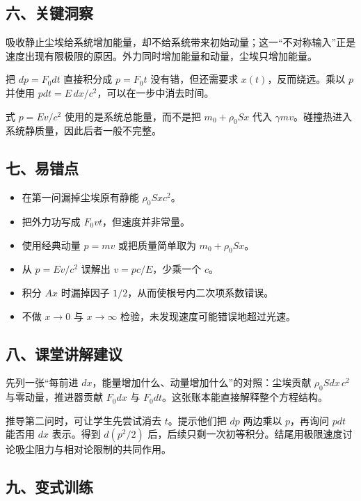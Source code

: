 \documentclass[12pt,a4paper,UTF8]{ctexart}
\newcommand{\tightlist}{\setlength{\itemsep}{0pt}\setlength{\parskip}{0pt}}
\begin{document}
\subsection{六、关键洞察}\label{ux516dux5173ux952eux6d1eux5bdf-2}

吸收静止尘埃给系统增加能量，却不给系统带来初始动量；这一``不对称输入''正是速度出现有限极限的原因。外力同时增加能量和动量，尘埃只增加能量。

把 \(dp=F_0dt\) 直接积分成 \(p=F_0t\) 没有错，但还需要求
\(x(t)\)，反而绕远。乘以 \(p\) 并使用
\(pdt=E\,dx/c^2\)，可以在一步中消去时间。

式 \(p=Ev/c^2\) 使用的是系统总能量，而不是把 \(m_0+\rho_0Sx\) 代入
\(\gamma mv\)。碰撞热进入系统静质量，因此后者一般不完整。

\subsection{七、易错点}\label{ux4e03ux6613ux9519ux70b9-2}

\begin{itemize}
\tightlist
\item
  在第一问漏掉尘埃原有静能 \(\rho_0Sxc^2\)。
\item
  把外力功写成 \(F_0vt\)，但速度并非常量。
\item
  使用经典动量 \(p=mv\) 或把质量简单取为 \(m_0+\rho_0Sx\)。
\item
  从 \(p=Ev/c^2\) 误解出 \(v=pc/E\)，少乘一个 \(c\)。
\item
  积分 \(Ax\) 时漏掉因子 \(1/2\)，从而使根号内二次项系数错误。
\item
  不做 \(x\to0\) 与 \(x\to\infty\) 检验，未发现速度可能错误地超过光速。
\end{itemize}

\subsection{八、课堂讲解建议}\label{ux516bux8bfeux5802ux8bb2ux89e3ux5efaux8bae-2}

先列一张``每前进 \(dx\)，能量增加什么、动量增加什么''的对照：尘埃贡献
\(\rho_0Sdx\,c^2\) 与零动量，推进器贡献 \(F_0dx\) 与
\(F_0dt\)。这张账本能直接解释整个方程结构。

推导第二问时，可让学生先尝试消去 \(t\)。提示他们把 \(dp\) 两边乘以
\(p\)，再询问 \(pdt\) 能否用 \(dx\) 表示。得到 \(d(p^2/2)\)
后，后续只剩一次初等积分。结尾用极限速度讨论吸尘阻力与相对论限制的共同作用。

\subsection{九、变式训练}\label{ux4e5dux53d8ux5f0fux8badux7ec3-2}
\end{document}
